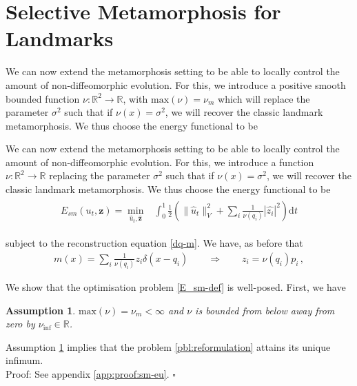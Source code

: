 \documentclass[runningheads]{llncs}
\newcommand{\half}{\frac 12}
\newcommand{\norm}[2]{\| #1 \|_{ #2 }}
\newcommand{\vnorm}[1]{\norm{ #1 }{V}}
\newcommand{\diff}[1]{\text{d} #1}
\newcommand{\nuinf}{\nu_\text{inf}}
\newtheorem{assumption}{Assumption}
\begin{document}
\section{Selective Metamorphosis for Landmarks}\label{sec:select_mm}

We can now extend the metamorphosis setting to be able to locally control the
amount of non-diffeomorphic evolution.  For this, we introduce a positive smooth
bounded function $\nu: \mathbb R^2\to \mathbb R$, with $\mathrm{max}(\nu) =
\nu_m$ which will replace the parameter $\sigma^2$ such that if
$\nu(x)=\sigma^2$, we will recover the classic landmark metamorphosis.  We thus
choose the energy functional to be

We can now extend the metamorphosis setting to be able to locally control the
amount of non-diffeomorphic evolution.  For this, we introduce a function $\nu:
\mathbb R^2\to \mathbb R$ replacing the parameter $\sigma^2$ such that if
$\nu(x)=\sigma^2$, we will recover the classic landmark metamorphosis.
We thus choose the energy functional to be
\begin{align}
  \begin{split}
    E_{sm}(u_t,\mathbf z) =\min_{\hat u_t, \hat{\mathbf z}} & \int_0^1
    \half  \left (\vnorm{\hat u_t}^2 +\sum_i \frac{1}{\nu(q_i)} |\hat{z_i}|^2\right )\diff{t}
  \end{split}
  \label{E_sm-def}
\end{align}

subject to the reconstruction equation \eqref{dq-m}. We have, as before that
\begin{align}\label{zp_relation}
  m(x) =  \sum_i \frac{1}{\nu(q_i)} z_i\delta(x-q_i)\qquad \Rightarrow \qquad
  z_i = \nu(q_i) p_i\, , 
\end{align}

We show that the optimisation problem \eqref{E_sm-def} is well-posed. First, we
have
\begin{assumption}\label{assumption:nu_bounded}
$\mathrm{max}(\nu) = \nu_m < \infty$ and $\nu$ is bounded from below
away from zero by $\nuinf \in \mathbb R$.
\end{assumption}

\begin{theorem}\label{sm-eu}
Assumption \ref{assumption:nu_bounded} implies that the problem
\eqref{pbl:reformulation} attains its unique infimum.\\

Proof: See appendix \ref{app:proof:sm-eu}.
{\hfill $\square$}
\end{theorem}
\end{document}
